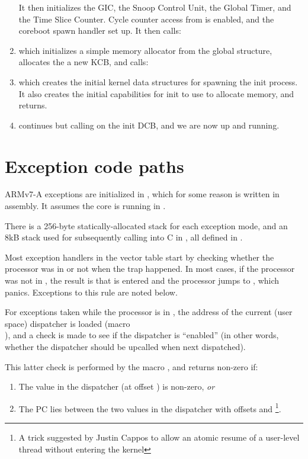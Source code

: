 \documentclass[a4paper,twoside]{report} %
\begin{document}
\begin{enumerate}
  It then initializes the GIC, the Snoop Control Unit, the Global
  Timer, and the Time Slice Counter.  Cycle counter access from
   is enabled, and the coreboot spawn handler set up.  It
  then calls:

\item {} which initializes
  a simple memory allocator from the global structure, allocates the
  a new KCB, and calls:

\item {} which creates the
  initial kernel data structures for spawning the init process.  It
  also creates the initial capabilities for init to use to allocate
  memory, and returns. 

\item {} continues
  but calling  on the init DCB, and we are now up and
  running. 
\end{enumerate}

\chapter{Exception code paths}

ARMv7-A exceptions are initialized in
, which for some reason is
written in assembly.  It assumes the core is running in . 

There is a 256-byte statically-allocated stack for each exception
mode, and an 8kB stack used for subsequently calling into C in
, all defined in . 

Most exception handlers in the vector table start by checking whether
the processor was in  or not when the trap happened.  In most
cases, if the processor was not in , the result is that
 is entered and the processor jumps to
, which panics.   Exceptions to this
rule are noted below. 

For exceptions taken while the processor is in , the
address of the current (user space) dispatcher is loaded (macro \\
), and a check is made to see if the
dispatcher is ``enabled'' (in other words, whether the dispatcher
should be upcalled when next dispatched).   

This latter check is performed by the macro ,
and returns non-zero if:
\begin{enumerate}
\item The  value in the dispatcher (at offset
  ) is non-zero, \emph{or}
\item The PC lies between the two values in the dispatcher with
  offsets  and
  \footnote{A trick suggested by
    Justin Cappos to allow an atomic resume of a user-level thread
    without entering the kernel}. 
\end{enumerate}
\end{document}
